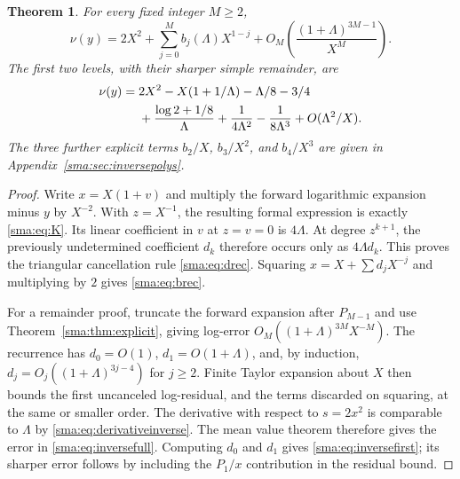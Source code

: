 \documentclass[11pt,letterpaper]{article}
\numberwithin{equation}{section}
\newtheorem{theorem}{Theorem}[section]\newtheorem{lemma}[theorem]{Lemma}\newtheorem{proposition}[theorem]{Proposition}\newtheorem{corollary}[theorem]{Corollary}\theoremstyle{remark}\newtheorem{remark}[theorem]{Remark}
\begin{document}
\begin{theorem}\label{sma:thm:inverse}
For every fixed integer $M\ge2$,
\begin{equation}\label{sma:eq:inversefull}
 \nu(y)=2X^2+\sum_{j=0}^M b_j(\Lambda)X^{1-j}
 +O_M\!\left(\frac{(1+\Lambda)^{3M-1}}{X^M}\right).
\end{equation}
The first two levels, with their sharper simple remainder, are
\begin{align}
 \nu(y)={}&2X^2-X(1+1/\Lambda)-\Lambda/8-3/4\notag\\
 &+\frac{\log2+1/8}{\Lambda}+\frac1{4\Lambda^2}-\frac1{8\Lambda^3}
 +O(\Lambda^2/X).\label{sma:eq:inversefirst}
\end{align}
The three further explicit terms $b_2/X$, $b_3/X^2$, and $b_4/X^3$ are given in Appendix~\ref{sma:sec:inversepolys}.
\end{theorem}
\begin{proof}
Write $x=X(1+v)$ and multiply the forward logarithmic expansion minus $y$ by $X^{-2}$. With $z=X^{-1}$, the resulting formal expression is exactly \eqref{sma:eq:K}. Its linear coefficient in $v$ at $z=v=0$ is $4\Lambda$. At degree $z^{k+1}$, the previously undetermined coefficient $d_k$ therefore occurs only as $4\Lambda d_k$. This proves the triangular cancellation rule \eqref{sma:eq:drec}. Squaring $x=X+\sum d_j X^{-j}$ and multiplying by $2$ gives \eqref{sma:eq:brec}.

For a remainder proof, truncate the forward expansion after $P_{M-1}$ and use Theorem~\ref{sma:thm:explicit}, giving log-error $O_M((1+\Lambda)^{3M}X^{-M})$. The recurrence has $d_0=O(1)$, $d_1=O(1+\Lambda)$, and, by induction, $d_j=O_j((1+\Lambda)^{3j-4})$ for $j\ge2$. Finite Taylor expansion about $X$ then bounds the first uncanceled log-residual, and the terms discarded on squaring, at the same or smaller order. The derivative with respect to $s=2x^2$ is comparable to $\Lambda$ by \eqref{sma:eq:derivativeinverse}. The mean value theorem therefore gives the error in \eqref{sma:eq:inversefull}. Computing $d_0$ and $d_1$ gives \eqref{sma:eq:inversefirst}; its sharper error follows by including the $P_1/x$ contribution in the residual bound.
\end{proof}
\end{document}
